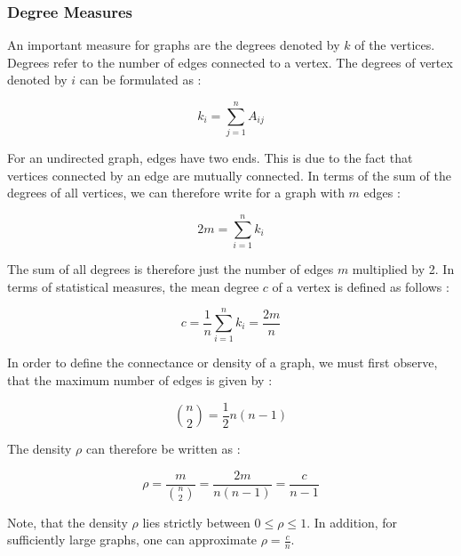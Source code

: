 	\subsubsection{Degree Measures}

	An important measure for graphs are the degrees denoted by $k$ of the
	vertices. Degrees refer to the number of edges connected to a vertex. The 
	degrees of vertex denoted by $i$ can be formulated as \citep[p. 133]{Newman2010}:

	\begin{equation}
		k_i = \sum_{j=1}^{n} A_{ij}
	\end{equation}

	\noindent For an undirected graph, edges have two ends. This is due to the 
	fact that vertices connected by an edge are mutually connected. In terms of 
	the sum of the degrees of all vertices, we can therefore write for a graph 
	with $m$ edges \citep[p. 133]{Newman2010}:

	\begin{equation}
		2m = \sum_{i=1}^{n} k_i	
	\end{equation}

	\noindent The sum of all degrees is therefore just the number of edges $m$ 
	multiplied by 2. In terms of statistical measures, the mean degree $c$ of a 
	vertex is defined as follows \citep[p. 134]{Newman2010}:

	\begin{equation}
		c = \frac{1}{n}\sum_{i=1}^{n}k_i = \frac{2m}{n}
	\end{equation}

	\noindent In order to define the connectance or density of a graph, we must
	first observe, that the maximum number of edges is given by \citep[p. 134]{Newman2010}:

	\begin{equation}
		{n \choose 2} = \frac{1}{2}n(n-1)
	\end{equation}

	\noindent The density $\rho$ can therefore be written as \citep[p. 134]{Newman2010}:

	\begin{equation}
		\rho = \frac{m}{{n \choose 2}} = \frac{2m}{n(n-1)} = \frac{c}{n-1}
	\end{equation}

	\noindent Note, that the density $\rho$ lies strictly between 
	$0 \leqslant \rho \leqslant 1$. In addition, for sufficiently large graphs,
	one can approximate $\rho = \frac{c}{n}$. 

